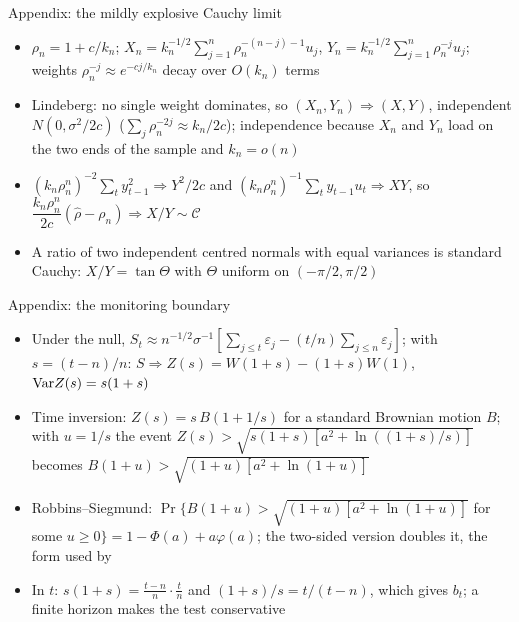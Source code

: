\begin{frame}{Appendix: the mildly explosive Cauchy limit}
\hypertarget{atsapp1}{}
\itemsize{\small}
\begin{itemize}
    \item $\rho_n = 1 + c/k_n$; $X_n = k_n^{-1/2}\sum_{j=1}^{n}\rho_n^{-(n-j)-1}u_j$, $Y_n = k_n^{-1/2}\sum_{j=1}^{n}\rho_n^{-j}u_j$; weights $\rho_n^{-j} \approx e^{-cj/k_n}$ decay over $O(k_n)$ terms
    \item Lindeberg: no single weight dominates, so $(X_n, Y_n) \Rightarrow (X, Y)$, independent $N(0, \sigma^2/2c)$ ($\sum_j\rho_n^{-2j} \approx k_n/2c$); independence because $X_n$ and $Y_n$ load on the two ends of the sample and $k_n = o(n)$
    \item $(k_n\rho_n^n)^{-2}\sum_t y_{t-1}^2 \Rightarrow Y^2/2c$ and $(k_n\rho_n^n)^{-1}\sum_t y_{t-1}u_t \Rightarrow XY$, so $\dfrac{k_n\rho_n^n}{2c}(\hat\rho - \rho_n) \Rightarrow X/Y \sim \mathcal C$ 
    \item A ratio of two independent centred normals with equal variances is standard Cauchy: $X/Y = \tan\Theta$ with $\Theta$ uniform on $(-\pi/2, \pi/2)$
\end{itemize}
\end{frame}

\begin{frame}{Appendix: the monitoring boundary}
\hypertarget{atsapp2}{}
\itemsize{\small}
\begin{itemize}
    \item Under the null, $S_t \approx n^{-1/2}\sigma^{-1}[\sum_{j \le t}\varepsilon_j - (t/n)\sum_{j \le n}\varepsilon_j]$; with $s = (t - n)/n$: $S \Rightarrow Z(s) = W(1 + s) - (1 + s)W(1)$, $\text{Var} Z(s) = s(1 + s)$
    \item Time inversion: $Z(s) = s\,B(1 + 1/s)$ for a standard Brownian motion $B$; with $u = 1/s$ the event $Z(s) > \sqrt{s(1 + s)[a^2 + \ln((1 + s)/s)]}$ becomes $B(1 + u) > \sqrt{(1 + u)[a^2 + \ln(1 + u)]}$
    \item Robbins--Siegmund: $\Pr\{B(1 + u) > \sqrt{(1 + u)[a^2 + \ln(1 + u)]}$ for some $u \ge 0\} = 1 - \Phi(a) + a\varphi(a)$; the two-sided version doubles it, the form used by 
    \item In $t$: $s(1 + s) = \frac{t - n}{n}\cdot\frac{t}{n}$ and $(1 + s)/s = t/(t - n)$, which gives $b_t$; a finite horizon makes the test conservative
\end{itemize}
\end{frame}


